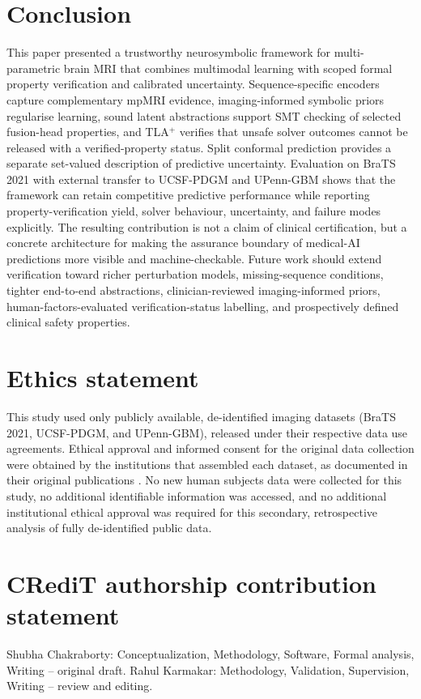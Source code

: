 \documentclass[preprint,11pt]{elsarticle}
\begin{document}
\section{Conclusion}
\label{sec:conclusion}

This paper presented a trustworthy neurosymbolic framework for multi-parametric brain MRI that combines multimodal learning with scoped formal property verification and calibrated uncertainty. Sequence-specific encoders capture complementary mpMRI evidence, imaging-informed symbolic priors regularise learning, sound latent abstractions support SMT checking of selected fusion-head properties, and TLA$^{+}$ verifies that unsafe solver outcomes cannot be released with a verified-property status. Split conformal prediction provides a separate set-valued description of predictive uncertainty. Evaluation on BraTS 2021 with external transfer to UCSF-PDGM and UPenn-GBM shows that the framework can retain competitive predictive performance while reporting property-verification yield, solver behaviour, uncertainty, and failure modes explicitly. The resulting contribution is not a claim of clinical certification, but a concrete architecture for making the assurance boundary of medical-AI predictions more visible and machine-checkable. Future work should extend verification toward richer perturbation models, missing-sequence conditions, tighter end-to-end abstractions, clinician-reviewed imaging-informed priors, human-factors-evaluated verification-status labelling, and prospectively defined clinical safety properties.

\section*{Ethics statement}
This study used only publicly available, de-identified imaging datasets (BraTS 2021, UCSF-PDGM, and UPenn-GBM), released under their respective data use agreements. Ethical approval and informed consent for the original data collection were obtained by the institutions that assembled each dataset, as documented in their original publications \cite{brats2021,ucsf2022,upenn2022}. No new human subjects data were collected for this study, no additional identifiable information was accessed, and no additional institutional ethical approval was required for this secondary, retrospective analysis of fully de-identified public data.

\section*{CRediT authorship contribution statement}
Shubha Chakraborty: Conceptualization, Methodology, Software, Formal analysis, Writing -- original draft. Rahul Karmakar: Methodology, Validation, Supervision, Writing -- review and editing.
\end{document}
